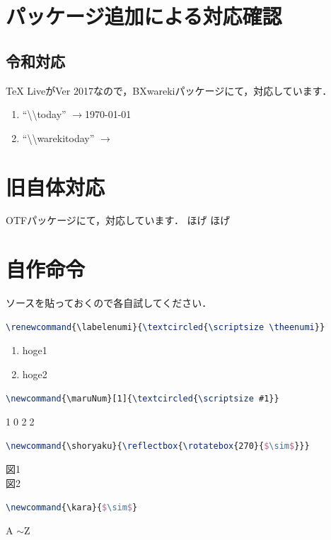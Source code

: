 \documentclass[10pt]{jarticle}
\newcommand{\zr}{$\rightarrow$}
\begin{document}
\section{パッケージ追加による対応確認}
\subsection{令和対応}
TeX LiveがVer 2017なので，BXwarekiパッケージ\cite{bxwareki}にて，対応しています．

\begin{enumerate}
	\item ``\textbackslash\textbackslash  today'' \zr \today
	\item ``\textbackslash\textbackslash warekitoday'' \zr \warekitoday
\end{enumerate}

\section{旧自体対応}
OTFパッケージにて，対応しています．
{
	\newcommand{\toku}{}
	ほげ \toku ほげ
}

\section{自作命令}
ソースを貼っておくので各自試してください．

\begin{lstlisting}[language=TeX, caption=enumiを丸数字に]
\renewcommand{\labelenumi}{\textcircled{\scriptsize \theenumi}} 
\end{lstlisting}

\begin{enumerate}
	\renewcommand{\labelenumi}{\textcircled{\scriptsize \theenumi}} %
	\item hoge1
	\item hoge2
\end{enumerate}

\begin{lstlisting}[language=TeX, caption=丸で文字を加工]
\newcommand{\maruNum}[1]{\textcircled{\scriptsize #1}} 
\end{lstlisting}
{
	\newcommand{\maruNum}[1]{\textcircled{\scriptsize #1}} %
	\maruNum{10} \maruNum{22}
}

\begin{lstlisting}[language=TeX, caption=縦省略記号]
\newcommand{\shoryaku}{\reflectbox{\rotatebox{270}{$\sim$}}} 
\end{lstlisting}
{
	\newcommand{\shoryaku}{} %
	図1 
	\shoryaku \\
	図2
}

\begin{lstlisting}[language=TeX, caption=横省略記号]
\newcommand{\kara}{$\sim$} 
\end{lstlisting}
{
	\newcommand{\kara}{$\sim$} %
	A \kara Z
}	



\end{document}
